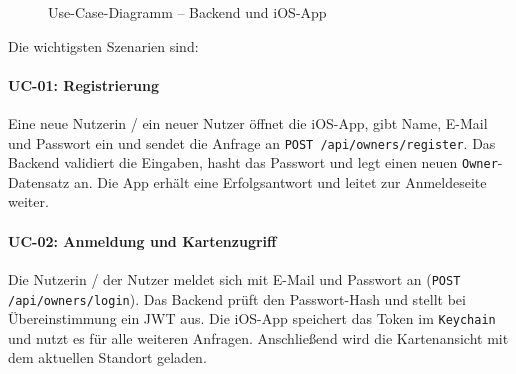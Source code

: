 \begin{figure}[H]
  \centering
  \caption{Use-Case-Diagramm – Backend und iOS-App}
  \label{fig:use-case}
\end{figure}

Die wichtigsten Szenarien sind:

\paragraph{UC-01: Registrierung}
Eine neue Nutzerin / ein neuer Nutzer öffnet die iOS-App, gibt Name, E-Mail und Passwort ein
und sendet die Anfrage an \texttt{POST /api/\allowbreak{}owners/\allowbreak{}register}. Das Backend validiert die
Eingaben, hasht das Passwort und legt einen neuen \texttt{Owner}-Datensatz an. Die App erhält
eine Erfolgsantwort und leitet zur Anmeldeseite weiter.

\paragraph{UC-02: Anmeldung und Kartenzugriff}
Die Nutzerin / der Nutzer meldet sich mit E-Mail und Passwort an (\texttt{POST /api/owners/login}).
Das Backend prüft den Passwort-Hash und stellt bei Übereinstimmung ein JWT aus. Die iOS-App
speichert das Token im \texttt{Keychain} und nutzt es für alle weiteren Anfragen. Anschließend
wird die Kartenansicht mit dem aktuellen Standort geladen.

